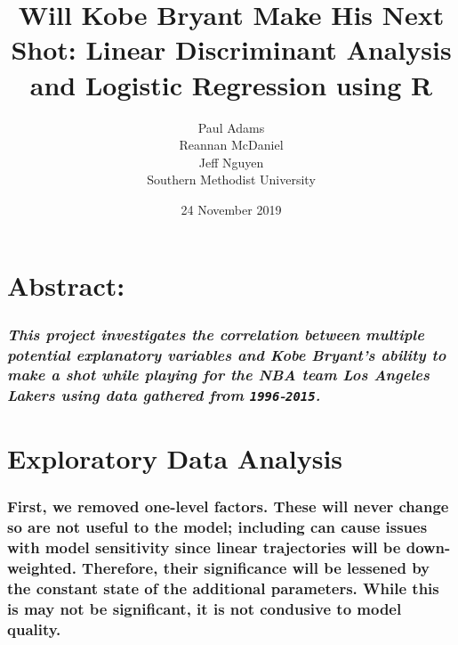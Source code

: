 \documentclass[]{article}
\title{Will Kobe Bryant Make His Next Shot: Linear Discriminant Analysis and
Logistic Regression using R}
\author{Paul Adams \\ Reannan McDaniel \\ Jeff Nguyen \\ Southern Methodist University}
\date{24 November 2019}
\begin{document}
\maketitle

\hypertarget{abstract}{%
\section{\texorpdfstring{\textbf{Abstract:}}{Abstract:}}\label{abstract}}

\hypertarget{this-project-investigates-the-correlation-between-multiple-potential-explanatory-variables-and-kobe-bryants-ability-to-make-a-shot-while-playing-for-the-nba-team-los-angeles-lakers-using-data-gathered-from-1996-2015.}{%
\subsubsection{\texorpdfstring{\emph{This project investigates the
correlation between multiple potential explanatory variables and Kobe
Bryant's ability to make a shot while playing for the NBA team Los
Angeles Lakers using data gathered from
\texttt{1996}-\texttt{2015}.}}{This project investigates the correlation between multiple potential explanatory variables and Kobe Bryant's ability to make a shot while playing for the NBA team Los Angeles Lakers using data gathered from 1996-2015.}}\label{this-project-investigates-the-correlation-between-multiple-potential-explanatory-variables-and-kobe-bryants-ability-to-make-a-shot-while-playing-for-the-nba-team-los-angeles-lakers-using-data-gathered-from-1996-2015.}}

\hypertarget{exploratory-data-analysis}{%
\section{\texorpdfstring{\textbf{Exploratory Data
Analysis}}{Exploratory Data Analysis}}\label{exploratory-data-analysis}}

\hypertarget{first-we-removed-one-level-factors.-these-will-never-change-so-are-not-useful-to-the-model-including-can-cause-issues-with-model-sensitivity-since-linear-trajectories-will-be-down-weighted.-therefore-their-significance-will-be-lessened-by-the-constant-state-of-the-additional-parameters.-while-this-is-may-not-be-significant-it-is-not-condusive-to-model-quality.}{%
\subsubsection{First, we removed one-level factors. These will never
change so are not useful to the model; including can cause issues with
model sensitivity since linear trajectories will be down-weighted.
Therefore, their significance will be lessened by the constant state of
the additional parameters. While this is may not be significant, it is
not condusive to model
quality.}\label{first-we-removed-one-level-factors.-these-will-never-change-so-are-not-useful-to-the-model-including-can-cause-issues-with-model-sensitivity-since-linear-trajectories-will-be-down-weighted.-therefore-their-significance-will-be-lessened-by-the-constant-state-of-the-additional-parameters.-while-this-is-may-not-be-significant-it-is-not-condusive-to-model-quality.}}
\end{document}
